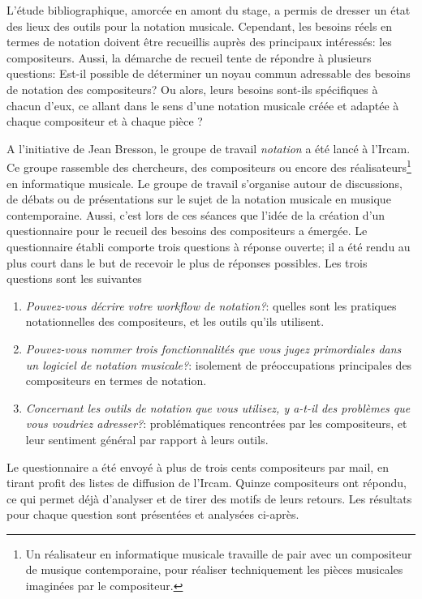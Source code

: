 L'étude bibliographique, amorcée en amont du stage, a permis de dresser un état des lieux des outils pour la notation musicale. Cependant, les besoins réels en termes de notation doivent être recueillis auprès des principaux intéressés: les compositeurs. Aussi, la démarche de recueil tente de répondre à plusieurs questions: Est-il possible de déterminer un noyau commun adressable des besoins de notation des compositeurs? Ou alors, leurs besoins sont-ils spécifiques à chacun d'eux, ce allant dans le sens d'une notation musicale créée et adaptée à chaque compositeur et à chaque pièce \cite{bosseur2005}?

A l'initiative de Jean Bresson, le groupe de travail \textit{notation} a été lancé à l'Ircam. Ce groupe rassemble des chercheurs, des compositeurs ou encore des réalisateurs\footnote{Un réalisateur en informatique musicale travaille de pair avec un compositeur de musique contemporaine, pour réaliser techniquement les pièces musicales imaginées par le compositeur.} en informatique musicale. Le groupe de travail s'organise autour de discussions, de débats ou de présentations sur le sujet de la notation musicale en musique contemporaine. Aussi, c'est lors de ces séances que l'idée de la création d'un questionnaire pour le recueil des besoins des compositeurs a émergée.
Le questionnaire établi comporte trois questions à réponse ouverte; il a été rendu au plus court dans le but de recevoir le plus de réponses possibles. Les trois questions sont les suivantes
\begin{enumerate}[label={(\arabic*)}]
	\item \textit{Pouvez-vous décrire votre workflow de notation?}: quelles sont les pratiques notationnelles des compositeurs, et les outils qu'ils utilisent.
	\item \textit{Pouvez-vous nommer trois fonctionnalités que vous jugez primordiales dans un logiciel de notation musicale?}: isolement de préoccupations principales des compositeurs en termes de notation.
	\item \textit{Concernant les outils de notation que vous utilisez, y a-t-il des problèmes que vous voudriez adresser?}: problématiques rencontrées par les compositeurs, et leur sentiment général par rapport à leurs outils.  
\end{enumerate}

Le questionnaire a été envoyé à plus de trois cents compositeurs par mail, en tirant profit des listes de diffusion de l'Ircam.
Quinze compositeurs ont répondu, ce qui permet déjà d'analyser et de tirer des motifs de leurs retours. Les résultats pour chaque question sont présentées et analysées ci-après.

